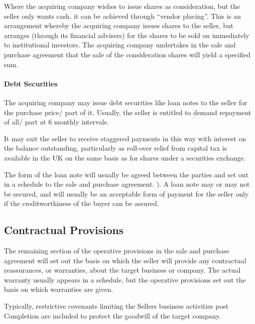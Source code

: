 \documentclass[
]{article}
\newenvironment{Shaded}{}{}
\newcommand{\NormalTok}[1]{#1}
\begin{document}
Where the acquiring company wishes to issue shares as consideration, but
the seller only wants cash, it can be achieved through ``vendor
placing''. This is an arrangement whereby the acquiring company issues
shares to the seller, but arranges (through its financial advisers) for
the shares to be sold on immediately to institutional investors. The
acquiring company undertakes in the sale and purchase agreement that the
sale of the consideration shares will yield a specified sum.

\hypertarget{debt-securities}{%
\paragraph{Debt Securities}\label{debt-securities}}

The acquiring company may issue debt securities like loan notes to the
seller for the purchase price/ part of it. Usually, the seller is
entitled to demand repayment of all/ part at 6 monthly intervals.

It may suit the seller to receive staggered payments in this way with
interest on the balance outstanding, particularly as roll-over relief
from capital tax is available in the UK on the same basis as for shares
under a securities exchange.

The form of the loan note will usually be agreed between the parties and
set out in a schedule to the sale and purchase agreement. ). A loan note
may or may not be secured, and will usually be an acceptable form of
payment for the seller only if the creditworthiness of the buyer can be
assured.

\hypertarget{contractual-provisions}{%
\subsection{Contractual Provisions}\label{contractual-provisions}}

The remaining section of the operative provisions in the sale and
purchase agreement will set out the basis on which the seller will
provide any contractual reassurances, or warranties, about the target
business or company. The actual warranty usually appears in a schedule,
but the operative provisions set out the basis on which warranties are
given.

\begin{Shaded}
\begin{Highlighting}[]
\NormalTok{Typically, restrictive covenants limiting the Seller\textquotesingle{}s business activities post Completion are included to protect the goodwill of the target company.}
\end{Highlighting}
\end{Shaded}
\end{document}
